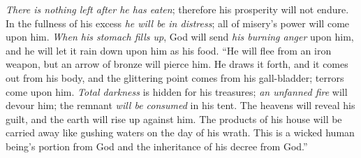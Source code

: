 \begin{biblechapter}
\verse \textit{There is nothing left after he has eaten}; 
therefore his prosperity will not endure.
\verse In the fullness of his excess \textit{he will be in distress}; 
all of misery’s power will come upon him.
\verse \textit{When his stomach fills up}, God will send \textit{his burning anger} upon him, 
and he will let it rain down upon him as his food.
\verse “He will flee from an iron weapon, 
but an arrow of bronze will pierce him.
\verse He draws it forth, and it comes out from his body, 
and the glittering point comes from his gall-bladder; 
terrors come upon him.
\verse \textit{Total darkness} is hidden for his treasures; 
\textit{an unfanned fire} will devour him; 
the remnant \textit{will be consumed} in his tent.
\verse The heavens will reveal his guilt, 
and the earth will rise up against him.
\verse The products of his house will be carried away 
like gushing waters on the day of his wrath.
\verse This is a wicked human being’s portion from God 
and the inheritance of his decree from God.”
\end{biblechapter}

